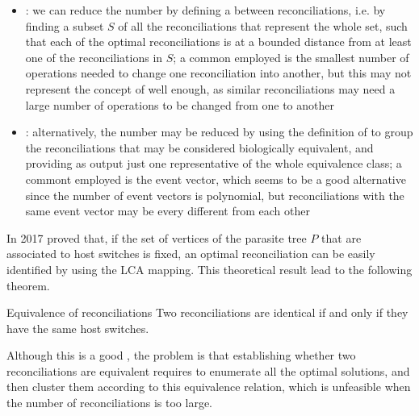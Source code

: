 \documentclass[a4paper, 12pt]{report}
\begin{document}
    \begin{itemize}
        \item {}: we can reduce the number by defining a  between reconciliations, i.e. by finding a subset $S$ of all the reconciliations that represent the whole set, such that each of the optimal reconciliations is at a bounded distance from at least one of the reconciliations in $S$; a common  employed is the smallest number of operations needed to change one reconciliation into another, but this may not represent the concept of  well enough, as similar reconciliations may need a large number of operations to be changed from one to another


        \item {}: alternatively, the number may be reduced by using the definition of  to group the reconciliations that may be considered biologically equivalent, and providing as output just one representative of the whole equivalence class; a commont  employed is the event vector, which seems to be a good alternative since the number of event vectors is polynomial, but reconciliations with the same event vector may be every different from each other
    \end{itemize}

    In 2017 \textcite{gastaldello} proved that, if the set of vertices of the parasite tree $P$ that are associated to host switches is fixed, an optimal reconciliation can be easily identified by using the LCA mapping. This theoretical result lead to the following theorem.

    \begin{framedthm}{Equivalence of reconciliations}
        Two reconciliations are identical if and only if they have the same host switches.
    \end{framedthm}


    Although this is a good , the problem is that establishing whether two reconciliations are equivalent requires to enumerate all the optimal solutions, and then cluster them according to this equivalence relation, which is unfeasible when the number of reconciliations is too large.
\end{document}
